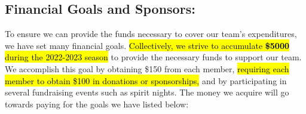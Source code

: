 \subsection*{\textbf{\Huge Financial Goals and Sponsors:}}
\vspace{.2cm}
\setlength{\parindent}{.25in} 

To ensure we can provide the funds necessary to cover our team's expenditures, we have set many financial goals. \hl{Collectively, we strive to accumulate \textbf{\$5000} during the 2022-2023 season} to provide the necessary funds to support our team.  We accomplish this goal by obtaining \$150 from each member, \hl{requiring each member to obtain \$100 in donations or sponsorships,} and by participating in several fundraising events such as spirit nights. The money we acquire will go towards paying for the goals we have listed below:

